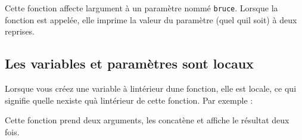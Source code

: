 Cette fonction affecte l\textquotesingle argument à un paramètre nommé
\texttt{bruce}. Lorsque la fonction est appelée, elle imprime la valeur
du paramètre (quel qu\textquotesingle il soit) à deux reprises.

\begin{Shaded}
\begin{Highlighting}[]
\OperatorTok{\textgreater{}\textgreater{}\textgreater{}}\NormalTok{)}
\OperatorTok{\textgreater{}\textgreater{}\textgreater{}}\NormalTok{)}
\OperatorTok{\textgreater{}\textgreater{}\textgreater{}}
\end{Highlighting}
\end{Shaded}

\hypertarget{les-variables-et-paramuxe8tres-sont-locaux}{%
\subsection{Les variables et paramètres sont
locaux}\label{les-variables-et-paramuxe8tres-sont-locaux}}

Lorsque vous créez une variable à l\textquotesingle intérieur
d\textquotesingle une fonction, elle est locale, ce qui signifie
qu\textquotesingle elle n\textquotesingle existe qu\textquotesingle à
l\textquotesingle intérieur de cette fonction. Par exemple :

\begin{Shaded}
\begin{Highlighting}[]
\OperatorTok{=}\OperatorTok{+}
\end{Highlighting}
\end{Shaded}

Cette fonction prend deux arguments, les concatène et affiche le
résultat deux fois.

\begin{Shaded}
\begin{Highlighting}[]
\OperatorTok{\textgreater{}\textgreater{}\textgreater{}}\OperatorTok{=} 
\OperatorTok{\textgreater{}\textgreater{}\textgreater{}}\OperatorTok{=} 
\OperatorTok{\textgreater{}\textgreater{}\textgreater{}}
\end{Highlighting}
\end{Shaded}

